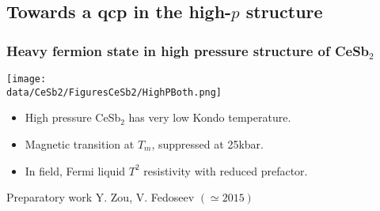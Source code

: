 \subsection{Towards a qcp in the high-$p$ structure}
\begin{frame}[label=CeSb2HighestP]
\frametitle{Heavy fermion state in high pressure structure of CeSb$_2$}


\centerline{\texttt{[image: \\data/CeSb2/FiguresCeSb2/HighPBoth.png]}}

\begin{itemize}
\item
High pressure CeSb$_2$ has very low Kondo temperature.

\item
Magnetic transition at $T_m$, suppressed at 25kbar.

\item
In field, Fermi liquid $T^2$ resistivity with reduced prefactor.

\end{itemize}
\vspace{0em}
\centerline{\makebox[\linewidth]{\rule{0.85\textwidth}{0.4pt}}}

\centerline{\scriptsize Preparatory work Y. Zou, V. Fedoseev $(\simeq 2015)$}

\end{frame}







